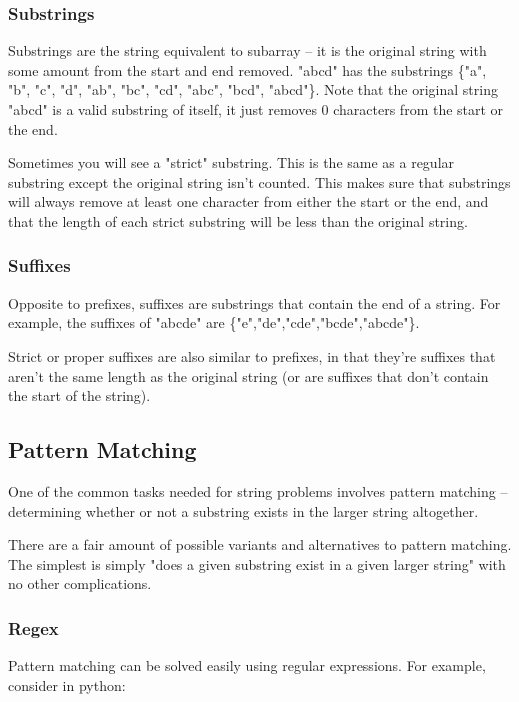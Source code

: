 \subsubsection{Substrings}

Substrings are the string equivalent to subarray -- it is the original string with some amount from the start and end removed. "abcd" has the substrings \{"a", "b", "c", "d", "ab", "bc", "cd", "abc", "bcd", "abcd"\}. Note that the original string "abcd" is a valid substring of itself, it just removes 0 characters from the start or the end.

Sometimes you will see a "strict" substring. This is the same as a regular substring except the original string isn't counted. This makes sure that substrings will always remove at least one character from either the start or the end, and that the length of each strict substring will be less than the original string.

\subsubsection{Suffixes}

Opposite to prefixes, suffixes are substrings that contain the end of a string. For example, the suffixes of "abcde" are \{"e","de","cde","bcde","abcde"\}.

Strict or proper suffixes are also similar to prefixes, in that they're suffixes that aren't the same length as the original string (or are suffixes that don't contain the start of the string).

\subsection{Pattern Matching}

One of the common tasks needed for string problems involves pattern matching -- determining whether or not a substring exists in the larger string altogether.

There are a fair amount of possible variants and alternatives to pattern matching. The simplest is simply "does a given substring exist in a given larger string" with no other complications.

\subsubsection{Regex}

Pattern matching can be solved easily using regular expressions. For example, consider in python:

